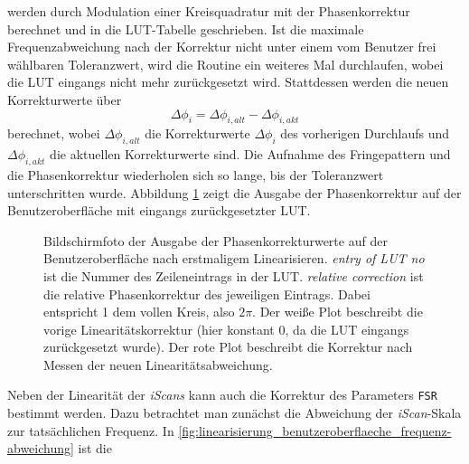 werden durch Modulation einer Kreisquadratur mit der Phasenkorrektur
berechnet und in die LUT-Tabelle geschrieben. Ist die
maximale Frequenzabweichung nach der Korrektur nicht unter einem vom Benutzer
frei wählbaren Toleranzwert, wird die Routine ein weiteres Mal durchlaufen,
wobei die LUT eingangs nicht mehr zurückgesetzt wird. Stattdessen werden die neuen Korrekturwerte über
\begin{equation}\label{eq:LUT_korrektur_02}
	\Delta\phi_i=\Delta\phi_{i,alt}-\Delta\phi_{i,akt}
\end{equation}
berechnet, wobei $\Delta\phi_{i,alt}$ die Korrekturwerte $\Delta\phi_i$
des vorherigen Durchlaufs und $\Delta\phi_{i,akt}$ die aktuellen Korrekturwerte
sind. Die Aufnahme des Fringepattern und die Phasenkorrektur wiederholen sich so
lange, bis der Toleranzwert unterschritten wurde. Abbildung
\ref{fig:linearisierung_benutzeroberflaeche_phasenkorrektur} zeigt die Ausgabe der Phasenkorrektur auf der Benutzeroberfläche mit eingangs zurückgesetzter LUT.\par
\begin{figure}[h]
 	\centering
	\caption[Benutzeroberfläche Linearisierung -
	Phasenkorrektur]{Bildschirmfoto der Ausgabe der Phasenkorrekturwerte auf der
	Benutzeroberfläche nach erstmaligem Linearisieren. \textit{entry
	of LUT no} ist die Nummer des Zeileneintrags in der LUT. \textit{relative
	correction} ist die relative Phasenkorrektur des jeweiligen Eintrags. Dabei
	entspricht 1 dem vollen Kreis, also $2\pi$. Der weiße Plot beschreibt die
	vorige Linearitätskorrektur (hier konstant 0, da die LUT eingangs zurückgesetzt
	wurde). Der rote Plot beschreibt die Korrektur nach Messen der neuen
	Linearitätsabweichung.}
	\label{fig:linearisierung_benutzeroberflaeche_phasenkorrektur}
\end{figure}
Neben der Linearität der \textit{iScans} kann auch die Korrektur des Parameters
\lstinline|FSR| bestimmt werden. Dazu betrachtet man zunächst die
Abweichung der \textit{iScan}-Skala zur tatsächlichen Frequenz. In
\ref{fig:linearisierung_benutzeroberflaeche_frequenz-abweichung} ist die
